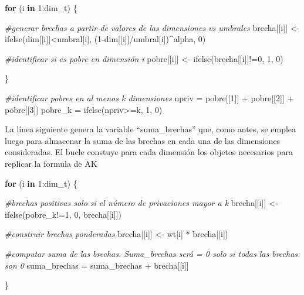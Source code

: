 \documentclass[
]{book}
\newenvironment{Shaded}{\begin{snugshade}}{\end{snugshade}}
\newcommand{\CommentTok}[1]{\textcolor[rgb]{0.56,0.35,0.01}{\textit{#1}}}
\newcommand{\ControlFlowTok}[1]{\textcolor[rgb]{0.13,0.29,0.53}{\textbf{#1}}}
\newcommand{\DecValTok}[1]{\textcolor[rgb]{0.00,0.00,0.81}{#1}}
\newcommand{\FunctionTok}[1]{\textcolor[rgb]{0.00,0.00,0.00}{#1}}
\newcommand{\NormalTok}[1]{#1}
\newcommand{\OtherTok}[1]{\textcolor[rgb]{0.56,0.35,0.01}{#1}}
\newcommand{\SpecialCharTok}[1]{\textcolor[rgb]{0.00,0.00,0.00}{#1}}
\begin{document}
\begin{Shaded}
\begin{Highlighting}[]
\ControlFlowTok{for}\NormalTok{ (i }\ControlFlowTok{in} \DecValTok{1}\SpecialCharTok{:}\NormalTok{dim\_t) \{}
  
    \CommentTok{\#generar brechas a partir de valores de las dimensiones vs umbrales}
\NormalTok{    brecha[[i]] }\OtherTok{\textless{}{-}} \FunctionTok{ifelse}\NormalTok{(dim[[i]]}\SpecialCharTok{\textless{}}\NormalTok{umbral[i], (}\DecValTok{1}\SpecialCharTok{{-}}\NormalTok{dim[[i]]}\SpecialCharTok{/}\NormalTok{umbral[i])}\SpecialCharTok{\^{}}\NormalTok{alpha, }\DecValTok{0}\NormalTok{)}
    
    \CommentTok{\#identificar si es pobre en dimensión i}
\NormalTok{    pobre[[i]] }\OtherTok{\textless{}{-}} \FunctionTok{ifelse}\NormalTok{(brecha[[i]]}\SpecialCharTok{!=}\DecValTok{0}\NormalTok{, }\DecValTok{1}\NormalTok{, }\DecValTok{0}\NormalTok{)}
  
\NormalTok{  \}}


\CommentTok{\#identificar pobres en al menos k dimensiones}
\NormalTok{npriv }\OtherTok{=}\NormalTok{ pobre[[}\DecValTok{1}\NormalTok{]] }\SpecialCharTok{+}\NormalTok{ pobre[[}\DecValTok{2}\NormalTok{]] }\SpecialCharTok{+}\NormalTok{ pobre[[}\DecValTok{3}\NormalTok{]]}
\NormalTok{pobre\_k }\OtherTok{=} \FunctionTok{ifelse}\NormalTok{(npriv}\SpecialCharTok{\textgreater{}=}\NormalTok{k, }\DecValTok{1}\NormalTok{, }\DecValTok{0}\NormalTok{)}
\end{Highlighting}
\end{Shaded}

La línea siguiente genera la variable ``suma\_brechas'' que, como antes, se emplea luego para almacenar la suma de las brechas en cada una de las dimensiones consideradas. El bucle constuye para cada dimensión los objetos necesarios para replicar la formula de AK

\begin{Shaded}
\begin{Highlighting}[]
\ControlFlowTok{for}\NormalTok{ (i }\ControlFlowTok{in} \DecValTok{1}\SpecialCharTok{:}\NormalTok{dim\_t) \{  }
  
    \CommentTok{\#brechas positivas solo si el número de privaciones mayor a k}
\NormalTok{    brecha[[i]] }\OtherTok{\textless{}{-}} \FunctionTok{ifelse}\NormalTok{(pobre\_k}\SpecialCharTok{!=}\DecValTok{1}\NormalTok{, }\DecValTok{0}\NormalTok{, brecha[[i]])}
    
    \CommentTok{\#construir brechas ponderadas}
\NormalTok{    brecha[[i]] }\OtherTok{\textless{}{-}}\NormalTok{ wt[i] }\SpecialCharTok{*}\NormalTok{ brecha[[i]]}
    
    \CommentTok{\#computar suma de las brechas. Suma\_brechas será = 0 solo si todas las brechas son 0}
\NormalTok{    suma\_brechas }\OtherTok{=}\NormalTok{ suma\_brechas }\SpecialCharTok{+}\NormalTok{ brecha[[i]]}
    
\NormalTok{\}}
\end{Highlighting}
\end{Shaded}
\end{document}
